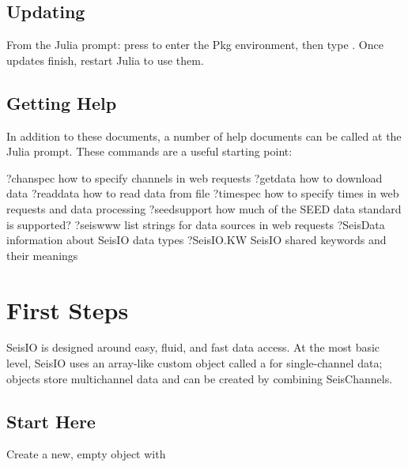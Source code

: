 \documentclass[letterpaper,11pt,english]{sphinxmanual}
\begin{document}
\subsection{Updating}
\label{\detokenize{src/intro:updating}}
From the Julia prompt: press \sphinxcode{\sphinxupquote{{]}}} to enter the Pkg environment, then type
. Once updates finish, restart Julia to use them.


\subsection{Getting Help}
\label{\detokenize{src/intro:getting-help}}
In addition to these documents, a number of help documents can be called at the
Julia prompt. These commands are a useful starting point:

%
\begin{sphinxVerbatim}[commandchars=\\\{\}]
?chanspec           \PYGZsh{} how to specify channels in web requests
?get\PYGZus{}data           \PYGZsh{} how to download data
?read\PYGZus{}data          \PYGZsh{} how to read data from file
?timespec           \PYGZsh{} how to specify times in web requests and data processing
?seed\PYGZus{}support       \PYGZsh{} how much of the SEED data standard is supported?
?seis\PYGZus{}www           \PYGZsh{} list strings for data sources in web requests
?SeisData           \PYGZsh{} information about SeisIO data types
?SeisIO.KW          \PYGZsh{} SeisIO shared keywords and their meanings
\end{sphinxVerbatim}


\section{First Steps}
\label{\detokenize{src/tutorial:first-steps}}\label{\detokenize{src/tutorial:tutorial}}\label{\detokenize{src/tutorial::doc}}
SeisIO is designed around easy, fluid, and fast data access.
At the most basic level, SeisIO uses an array-like custom object called a
 for single-channel data;  objects store
multichannel data and can be created by combining SeisChannels.


\subsection{Start Here}
\label{\detokenize{src/tutorial:start-here}}
Create a new, empty  object with
\end{document}
